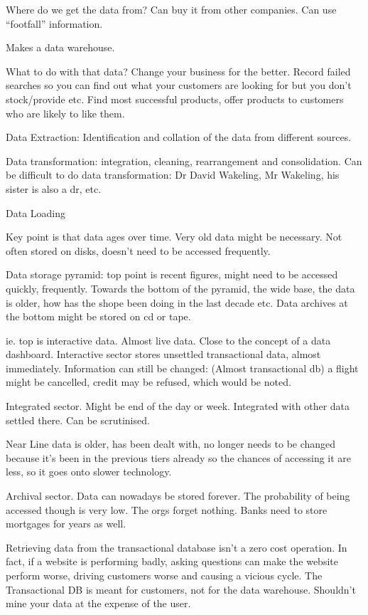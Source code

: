 \documentclass[11pt]{article}
\begin{document}
Where do we get the data from? Can buy it from other companies. Can use “footfall” information.

Makes a data warehouse.

What to do with that data? Change your business for the better. Record failed searches so you can find out what your customers are looking for but you don’t stock/provide etc. Find most successful products, offer products to customers who are likely to like them.

Data Extraction: Identification and collation of the data from different sources.

Data transformation: integration, cleaning, rearrangement and consolidation. Can be difficult to do data transformation: Dr David Wakeling, Mr Wakeling, his sister is also a dr, etc.

Data Loading

Key point is that data ages over time. Very old data might be necessary. Not often stored on disks, doesn’t need to be accessed frequently.

Data storage pyramid: top point is recent figures, might need to be accessed quickly, frequently. Towards the bottom of the pyramid, the wide base, the data is older, how has the shope been doing in the last decade etc. Data archives at the bottom might be stored on cd or tape.

ie. top is interactive data. Almost live data. Close to the concept of a data dashboard. Interactive sector stores unsettled transactional data, almost immediately. Information can still be changed: (Almost transactional db) a flight might be cancelled, credit may be refused, which would be noted.

Integrated sector. Might be end of the day or week. Integrated with other data settled there. Can be scrutinised.

Near Line data is older, has been dealt with, no longer needs to be changed because it’s been in the previous tiers already so the chances of accessing it are less, so it goes onto slower technology.

Archival sector. Data can nowadays be stored forever. The probability of being accessed though is very low. The orgs forget nothing. Banks need to store mortgages for years as well.

Retrieving data from the transactional database isn’t a zero cost operation. In fact, if a website is performing badly, asking questions can make the website perform worse, driving customers worse and causing a vicious cycle. The Transactional DB is meant for customers, not for the data warehouse. Shouldn’t mine your data at the expense of the user.
\end{document}
